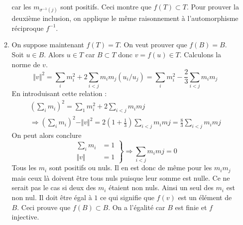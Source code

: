 \begin{enumerate}
\begin{enumerate}
\begin{displaymath}
\end{displaymath}
car les $ m_{\sigma^{-1}(j)}$ sont positifs. Ceci montre que $f(T)\subset T$. Pour prouver la deuxième inclusion, on applique le même raisonnement à l'automorphisme réciproque $f^{-1}$. 
 \item On suppose maintenant $f(T)=T$. On veut prouver que $f(B)=B$.\newline
Soit $u\in B$. Alors $u\in T$ car $B\subset T$ donc $v=f(u)\in T$. Calculons la norme de $v$.
\begin{displaymath}
 \Vert v\Vert^2 = \sum_i m_i^2 +2\sum_{i<j}m_im_j(u_i/u_j)
= \sum_i m_i^2 -\frac{2}{3}\sum_{i<j}m_im_j
\end{displaymath}
En introduisant cette relation :
\begin{multline*}
 \left( \sum_im_i\right)^2=\sum_1m_i^2 +2\sum_{i<j}m_imj \\
\Rightarrow
 \left( \sum_im_i\right)^2-\Vert v \Vert^2 
=2(1+\frac{1}{3})\sum_{i<j}m_imj=\frac{8}{3}\sum_{i<j}m_imj
\end{multline*}
On peut alors conclure
\begin{displaymath}
 \left. 
\begin{aligned}
 \sum_im_i &= 1\\
 \Vert v\Vert &=1
\end{aligned}
\right\rbrace 
\Rightarrow
\sum_{i<j}m_imj=0
\end{displaymath}
Tous les $m_i$ sont positifs ou nuls. Il en est donc de même pour les $m_im_j$ mais ceux là doivent être tous nuls puisque leur somme est nulle. Ce ne serait pas le cas si deux des $m_i$ étaient non nuls. Ainsi un seul des $m_i$ est non nul. Il doit être égal à $1$ ce qui signifie que $f(v)$ est un élément de $B$. Ceci prouve que $f(B)\subset B$. On a l'égalité car $B$ est finie et $f$ injective.
\end{enumerate}
 

\end{enumerate}
